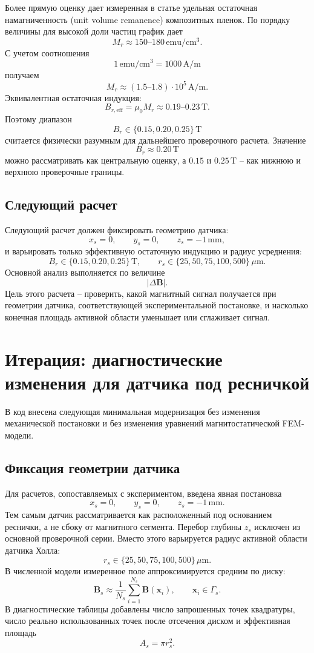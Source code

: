 \documentclass[12pt,a4paper]{article}
\begin{document}
Более прямую оценку дает измеренная в статье удельная остаточная
намагниченность (unit volume remanence) композитных пленок. По порядку
величины для высокой доли частиц график дает
\[
    M_r\approx 150\text{--}180\,\mathrm{emu/cm^3}.
\]
С учетом соотношения
\[
    1\,\mathrm{emu/cm^3}=1000\,\mathrm{A/m}
\]
получаем
\[
    M_r\approx
    (1.5\text{--}1.8)\cdot 10^5\,\mathrm{A/m}.
\]
Эквивалентная остаточная индукция:
\[
    B_{r,\mathrm{eff}}
    =
    \mu_0 M_r
    \approx
    0.19\text{--}0.23\,\mathrm{T}.
\]
Поэтому диапазон
\[
    B_r\in\{0.15,0.20,0.25\}\,\mathrm{T}
\]
считается физически разумным для дальнейшего проверочного расчета. Значение
\[
    B_r\approx 0.20\,\mathrm{T}
\]
можно рассматривать как центральную оценку, а \(0.15\) и \(0.25\,\mathrm{T}\)
-- как нижнюю и верхнюю проверочные границы.

\subsection*{Следующий расчет}

Следующий расчет должен фиксировать геометрию датчика:
\[
    x_s=0,\qquad y_s=0,\qquad z_s=-1\,\mathrm{mm},
\]
и варьировать только эффективную остаточную индукцию и радиус усреднения:
\[
    B_r\in\{0.15,0.20,0.25\}\,\mathrm{T},
    \qquad
    r_s\in\{25,50,75,100,500\}\,\mu\mathrm{m}.
\]
Основной анализ выполняется по величине
\[
    |\Delta\mathbf B|.
\]
Цель этого расчета -- проверить, какой магнитный сигнал получается при
геометрии датчика, соответствующей экспериментальной постановке, и насколько
конечная площадь активной области уменьшает или сглаживает сигнал.

\section{Итерация: диагностические изменения для датчика под ресничкой}

В код внесена следующая минимальная модернизация без изменения механической
постановки и без изменения уравнений магнитостатической FEM-модели.

\subsection*{Фиксация геометрии датчика}

Для расчетов, сопоставляемых с экспериментом, введена явная постановка
\[
    x_s=0,\qquad y_s=0,\qquad z_s=-1\,\mathrm{mm}.
\]
Тем самым датчик рассматривается как расположенный под основанием реснички, а
не сбоку от магнитного сегмента. Перебор глубины \(z_s\) исключен из основной
проверочной серии. Вместо этого варьируется радиус активной области
датчика Холла:
\[
    r_s\in\{25,50,75,100,500\}\,\mu\mathrm{m}.
\]
В численной модели измеренное поле аппроксимируется средним по диску:
\[
    \mathbf B_s
    \approx
    \frac{1}{N_s}\sum_{i=1}^{N_s}\mathbf B(\mathbf x_i),
    \qquad
    \mathbf x_i\in \Gamma_s .
\]
В диагностические таблицы добавлены число запрошенных точек квадратуры,
число реально использованных точек после отсечения диском и эффективная
площадь
\[
    A_s=\pi r_s^2 .
\]
\end{document}

